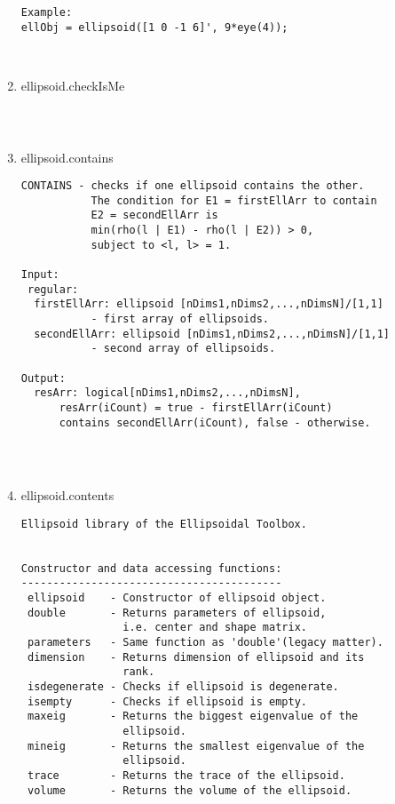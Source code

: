 \begin{enumerate}
\begin{lstlisting}
Example:
ellObj = ellipsoid([1 0 -1 6]', 9*eye(4));



\end{lstlisting}
\fontfamily{\familydefault}
\selectfont
\item {ellipsoid.checkIsMe}
\selectfont
\begin{lstlisting}



\end{lstlisting}
\fontfamily{\familydefault}
\selectfont
\item {ellipsoid.contains}
\selectfont
\begin{lstlisting}
CONTAINS - checks if one ellipsoid contains the other.
           The condition for E1 = firstEllArr to contain
           E2 = secondEllArr is
           min(rho(l | E1) - rho(l | E2)) > 0,
           subject to <l, l> = 1.

Input:
 regular:
  firstEllArr: ellipsoid [nDims1,nDims2,...,nDimsN]/[1,1]
           - first array of ellipsoids.
  secondEllArr: ellipsoid [nDims1,nDims2,...,nDimsN]/[1,1]
           - second array of ellipsoids.

Output:
  resArr: logical[nDims1,nDims2,...,nDimsN],
      resArr(iCount) = true - firstEllArr(iCount)
      contains secondEllArr(iCount), false - otherwise.




\end{lstlisting}
\fontfamily{\familydefault}
\selectfont
\item {ellipsoid.contents}
\selectfont
\begin{lstlisting}
Ellipsoid library of the Ellipsoidal Toolbox.


Constructor and data accessing functions:
-----------------------------------------
 ellipsoid    - Constructor of ellipsoid object.
 double       - Returns parameters of ellipsoid,
                i.e. center and shape matrix.
 parameters   - Same function as 'double'(legacy matter).
 dimension    - Returns dimension of ellipsoid and its
                rank.
 isdegenerate - Checks if ellipsoid is degenerate.
 isempty      - Checks if ellipsoid is empty.
 maxeig       - Returns the biggest eigenvalue of the
                ellipsoid.
 mineig       - Returns the smallest eigenvalue of the
                ellipsoid.
 trace        - Returns the trace of the ellipsoid.
 volume       - Returns the volume of the ellipsoid.



\end{lstlisting}
\end{enumerate}
